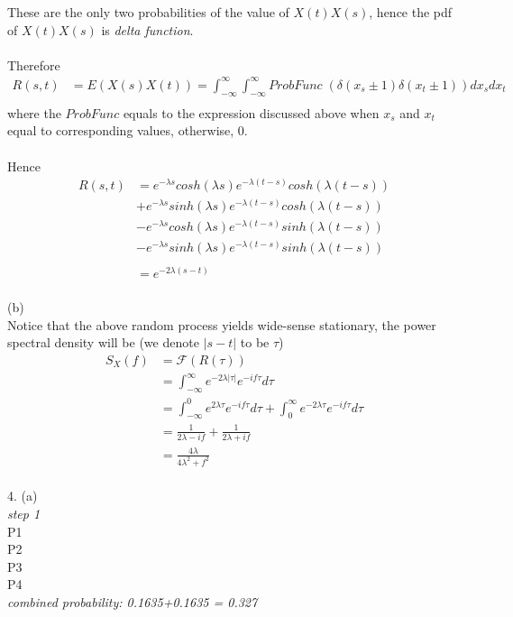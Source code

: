 \documentclass [12pt] {article}
\begin{document}
These are the only two probabilities of the value of $X(t)X(s)$, hence the pdf of $X(t)X(s)$ is \emph{delta function}.\\
~\\
Therefore \begin{align*}
R(s,t) &= E(X(s)X(t)) = \int_{-\infty}^\infty \int_{-\infty}^\infty ProbFunc\; (\delta(x_s\pm 1)\delta(x_t \pm 1)) d x_s d x_t\\
\end{align*}
where the $ProbFunc$ equals to the expression discussed above when $x_s$ and $x_t$ equal to corresponding values, otherwise, 0.\\
~\\
Hence\begin{align*}
R(s,t) &= e^{-\lambda s} cosh(\lambda s) e^{-\lambda (t-s)} cosh(\lambda (t-s))\\
&+ e^{-\lambda s} sinh(\lambda s) e^{-\lambda (t-s)} cosh(\lambda (t-s))\\
&-e^{-\lambda s} cosh(\lambda s) e^{-\lambda (t-s)} sinh(\lambda (t-s))\\
&-e^{-\lambda s} sinh(\lambda s) e^{-\lambda (t-s)} sinh(\lambda (t-s))\\
\\
&= e^{-2\lambda (s-t)}
\end{align*}
~\\
(b)\\
Notice that the above random process yields wide-sense stationary, the power spectral density will be (we denote $|s-t|$ to be $\tau$)
\begin{align*}
S_X(f) & = \mathcal{F}(R(\tau))\\
&= \int_{-\infty}^\infty e^{-2\lambda |\tau|} e^{-i f \tau} d\tau\\
& = \int_{-\infty}^0 e^{2\lambda \tau} e^{-i f \tau} d\tau +\int_0^\infty e^{-2\lambda \tau} e^{-i f \tau} d\tau\\
&= \frac{1}{2\lambda - i f} + \frac{1}{2\lambda + i f} \\
&= \frac{4 \lambda}{4\lambda^2 + f^2}
\end{align*}
~\\
4. (a)\\
\emph{step 1} \\
P1  \\
P2  \\
P3  \\
P4  \\
\emph{combined probability: 0.1635+0.1635 = 0.327}\\
\end{document}
